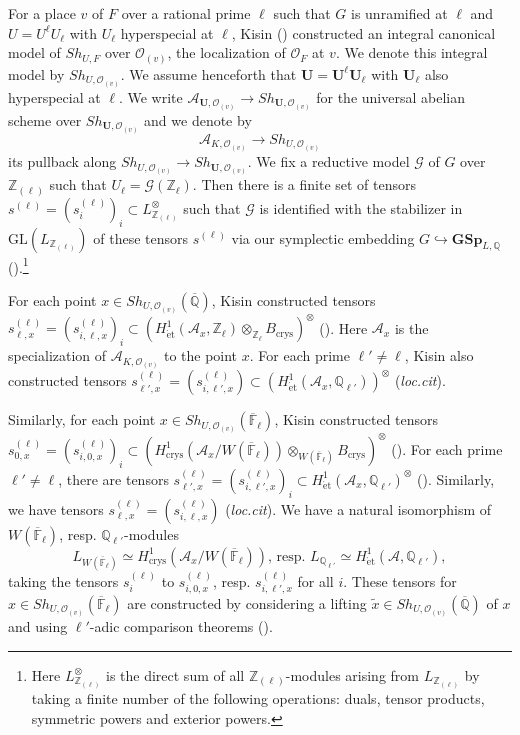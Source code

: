 \documentclass[11pt,oneside,reqno]{amsart}
\newcommand{\bfGSp}{\mathbf{GSp}}
\newcommand{\etrm}{\mathrm{\acute{e}t}}
\newcommand{\GL}{\mathrm{GL}}
\newcommand{\crys}{\mathrm{crys}}
\newcommand{\F}{\mathbb{F}}
\newcommand{\Q}{\mathbb{Q}}
\newcommand{\Z}{\mathbb{Z}}
\newcommand{\Acal}{\mathcal{A}}
\newcommand{\Gcal}{\mathcal{G}}
\newcommand{\Ocal}{\mathcal{O}}
\newcommand{\Ubf}{\mathbf{U}}
\theoremstyle{plain}
\begin{document}
	
	For a place $v$ of $F$ over a rational prime $\ell$ such that $G$ is unramified at $\ell$ and $U=U^\ell U_\ell$ with $U_\ell$ hyperspecial at $\ell$, Kisin (\cite{Kisin2010}) constructed an integral canonical model of $Sh_{U,F}$ over $\Ocal_{(v)}$, the localization of $\Ocal_F$ at $v$. We denote this integral model by $Sh_{U,\Ocal_{(v)}}$. We assume henceforth that $\Ubf=\Ubf^\ell\Ubf_\ell$ with $\Ubf_\ell$ also hyperspecial at $\ell$.
	We write $\Acal_{\Ubf,\Ocal_{(v)}}\to Sh_{\Ubf,\Ocal_{(v)}}$ for the universal abelian scheme over $Sh_{\Ubf,\Ocal_{(v)}}$ and we denote by
	\[
	\Acal_{K,\Ocal_{(v)}}\to Sh_{U,\Ocal_{(v)}}
	\]
	its pullback along $Sh_{U,\Ocal_{(v)}}\to Sh_{\Ubf,\Ocal_{(v)}}$. We fix a reductive model $\Gcal$ of $G$ over $\Z_{(\ell)}$ such that $U_\ell=\Gcal(\Z_\ell)$. Then there is a finite set of tensors $s^{(\ell)}=(s_i^{(\ell)})_i\subset L^\otimes_{\Z_{(\ell)}}$ such that $\Gcal$ is identified with the stabilizer in $\GL(L_{\Z_{(\ell)}})$ of these tensors $s^{(\ell)}$ via our symplectic embedding $G\hookrightarrow\bfGSp_{L,\Q}$ (\cite[§2.3.1 and §2.3.2]{Kisin2010}).\footnote{Here $L_{\Z_{(\ell)}}^\otimes$ is the direct sum of all $\Z_{(\ell)}$-modules arising from $L_{\Z_{(\ell)}}$ by taking a finite number of the following operations: duals, tensor products, symmetric powers and exterior powers.}
	
	
	
	
	For each point $x\in Sh_{U,\Ocal_{(v)}}(\overline{\Q})$, Kisin constructed tensors $s^{(\ell)}_{\ell,x}=(s^{(\ell)}_{i,\ell,x})_i\subset(H_\etrm^1(\Acal_x,\Z_\ell)\otimes_{\Z_\ell}B_\crys)^\otimes$ (\cite[§1.3.6]{Kisin2017}). Here $\Acal_x$ is the specialization of $\Acal_{K,\Ocal_{(v)}}$ to the point $x$. For each prime $\ell'\neq\ell$, Kisin also constructed tensors $s^{(\ell)}_{\ell',x}=(s^{(\ell)}_{i,\ell',x})\subset(H^1_\etrm(\Acal_x,\Q_{\ell'}))^\otimes$ (\emph{loc.cit}).
	
	
	
	Similarly, for each point $x\in Sh_{U,\Ocal_{(v)}}(\overline{\F}_\ell)$, Kisin constructed tensors $s^{(\ell)}_{0,x}=(s^{(\ell)}_{i,0,x})_i\subset(H^1_\crys(\Acal_x/W(\overline{\F}_\ell))\otimes_{W(\overline{\F}_\ell)}B_\crys)^\otimes$ (\cite[§1.3.10]{Kisin2017}). For each prime $\ell'\neq\ell$, there are tensors $s^{(\ell)}_{\ell',x}=(s^{(\ell)}_{i,\ell',x})_i\subset H^1_\etrm(\Acal_x,\Q_{\ell'})^\otimes$ (\cite[§1.3.6]{Kisin2017}). Similarly, we have tensors $s^{(\ell)}_{\ell,x}=(s^{(\ell)}_{i,\ell,x})$ (\emph{loc.cit}). We have a natural isomorphism of $W(\overline{\F}_\ell)$, resp. $\Q_{\ell'}$-modules
	\begin{equation}\label{relation between Hodge tensors}
		L_{W(\overline{\F}_\ell)}\simeq
		H^1_\crys(\Acal_x/W(\overline{\F}_\ell)),\,
		\text{resp. }
		L_{\Q_{\ell'}}\simeq
		H^1_\etrm(\Acal,\Q_{\ell'}),
	\end{equation}
	taking the tensors $s^{(\ell)}_i$ to $s^{(\ell)}_{i,0,x}$, resp. $s^{(\ell)}_{i,\ell',x}$ for all $i$. These tensors for $x\in Sh_{U,\Ocal_{(v)}}(\overline{\F}_\ell)$ are constructed by considering a lifting $\widetilde{x}\in Sh_{U,\Ocal_{(v)}}(\overline{\Q})$ of $x$ and using $\ell'$-adic comparison theorems (\cite[Proposition 1.3.7]{Kisin2017}).
	
\end{document}
